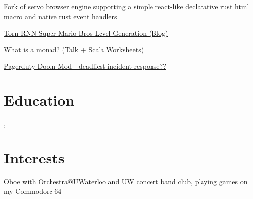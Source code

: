 \documentclass[12pt]{jmichaud-resume}
\begin{document}
\hfill
\begin{minipage}[t]{0.49\textwidth}
	
	 \hfill
	\begin{tightemize}
		\item Fork of servo browser engine supporting a simple react-like declarative rust html macro and native rust event handlers
	\end{tightemize}
	\sectionsep
	
\end{minipage} 
\hfill
\begin{minipage}[t]{0.49\textwidth}
	
	 \hfill
	\begin{tightemize}
		\item\href{https://medium.com/@justin_michaud/super-mario-bros-level-generation-using-torch-rnn-726ddea7e9b7}{Torn-RNN Super Mario Bros Level Generation (Blog)}
		\item\href{https://github.com/justinmichaud/scala-monad-worksheets/}{What is a monad? (Talk + Scala Worksheets)}
		\item\href{NOWHERE}{Pagerduty Doom Mod - deadliest incident response??}
	\end{tightemize}
	\sectionsep
\end{minipage}

\section{Education} 
,  \hfill {}

\section{Interests}
Oboe with Orchestra@UWaterloo and UW concert band club, playing games on my Commodore 64\\
\end{document}
